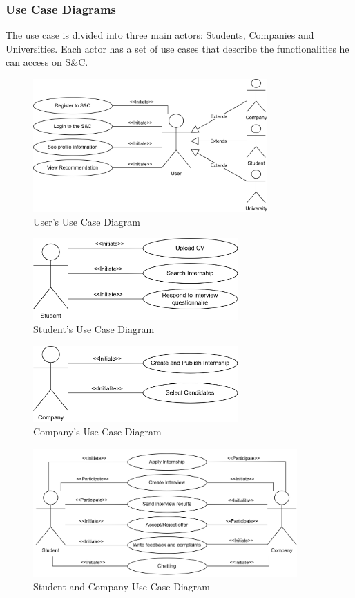 \subsubsection{Use Case Diagrams}
The use case is divided into three main actors: Students, Companies and Universities. Each actor has a set of use cases that
describe the functionalities he can access on S\&C.
\begin{figure}[H]
    \centering
    \includegraphics[width=0.8\textwidth]{Images/Use_Case_Diagrams/User_diagram.png}
    \caption{User's Use Case Diagram}
\end{figure}
\begin{figure}[H]
    \centering
    \includegraphics[width=0.7\textwidth]{Images/Use_Case_Diagrams/Student_diagram.png}
    \caption{Student's Use Case Diagram}
\end{figure}
\begin{figure}[H]
    \centering
    \includegraphics[width=0.7\textwidth]{Images/Use_Case_Diagrams/Company_diagram.png}
    \caption{Company's Use Case Diagram}
\end{figure}
\begin{figure}[H]
    \centering
    \includegraphics[width=0.9\textwidth]{Images/Use_Case_Diagrams/SandC_diagram.png}
    \caption{Student and Company Use Case Diagram}
\end{figure}
